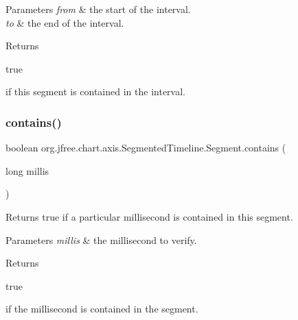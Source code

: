 \begin{DoxyParams}{Parameters}
{\em from} & the start of the interval. \\
\hline
{\em to} & the end of the interval.\\
\hline
\end{DoxyParams}
\begin{DoxyReturn}{Returns}

\begin{DoxyCode}
\textcolor{keyword}{true} 
\end{DoxyCode}
 if this segment is contained in the interval. 
\end{DoxyReturn}
\mbox{\label{classorg_1_1jfree_1_1chart_1_1axis_1_1_segmented_timeline_1_1_segment_a0e0b4847871d4cb22fa64e79e933ad2e}} 
\subsubsection{\texorpdfstring{contains()}{contains()}\hspace{0.1cm}{\footnotesize\ttfamily [1/3]}}
{\footnotesize\ttfamily boolean org.\+jfree.\+chart.\+axis.\+Segmented\+Timeline.\+Segment.\+contains (\begin{DoxyParamCaption}\item[{long}]{millis }\end{DoxyParamCaption})}

Returns true if a particular millisecond is contained in this segment.


\begin{DoxyParams}{Parameters}
{\em millis} & the millisecond to verify.\\
\hline
\end{DoxyParams}
\begin{DoxyReturn}{Returns}

\begin{DoxyCode}
\textcolor{keyword}{true} 
\end{DoxyCode}
 if the millisecond is contained in the segment. 
\end{DoxyReturn}
\mbox{\label{classorg_1_1jfree_1_1chart_1_1axis_1_1_segmented_timeline_1_1_segment_a51d3d71b20d5224788e21a54d600bbd1}} 
